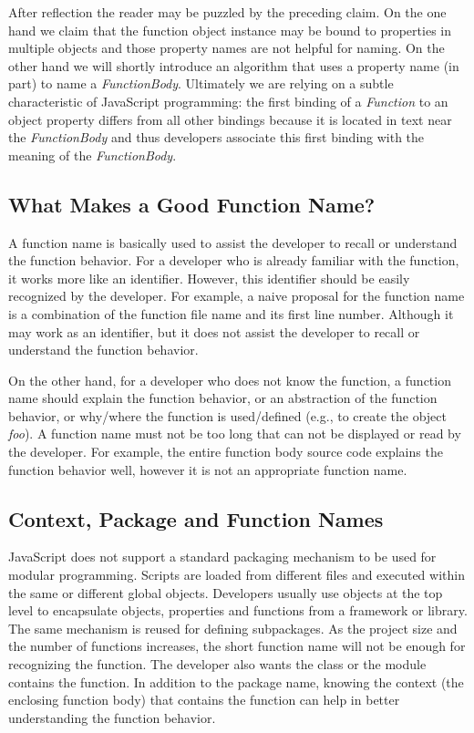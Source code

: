 \documentclass[10pt, preprint]{sigplanconf}
\begin{document}
After reflection the reader may be puzzled by the preceding claim. On the one hand we claim that the function object instance may be bound to properties in multiple objects and those property names are not helpful for naming. On the other hand we will shortly introduce an algorithm that uses a property name (in part) to name a {\textit{FunctionBody}}. Ultimately we are relying on a subtle characteristic of JavaScript programming: the first binding of a {\textit{Function}}  to an object property differs from all other bindings because it is located in text near the {\textit{FunctionBody}} and thus developers associate this first binding with the meaning of the {\textit{FunctionBody}}. 

\subsection{What Makes a Good Function Name?}
A function name is basically used to assist the developer to recall or understand the function behavior. For a developer who is already familiar with the function, it works more like an identifier. However, this identifier should be easily recognized by the developer. For example, a naive proposal for the function name is a combination of the function file name and its first line number. Although it may work as an identifier, but it does not assist the developer to recall or understand the function behavior.

 On the other hand, for a developer who does not know the function, a function name should explain the function behavior, or an abstraction of the function behavior, or why/where the function is used/defined (e.g., to create the object \textit{foo}). A function name must not be too long that can not be displayed or read by the developer. For example, the entire function body source code explains the function behavior well, however it is not an appropriate function name.

\subsection{Context, Package and Function Names}
JavaScript does not support a standard packaging mechanism to be used for modular programming. Scripts are loaded from different files and executed within the same or different global objects. Developers usually use objects at the top level to encapsulate objects, properties and functions from a framework or library. The same mechanism is reused for defining subpackages. As the project size and the number of functions increases, the short function name will not be enough for recognizing the function. The developer also wants the class or the module contains the function. In addition to the package name, knowing the context (the enclosing function body) that contains the function can help in better understanding the function behavior.
\end{document}
